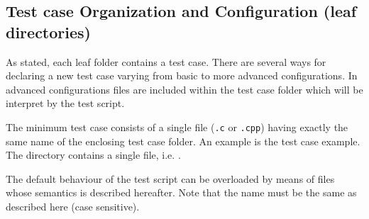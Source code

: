 \subsection{Test case Organization and Configuration (leaf directories)}
As stated, each leaf folder contains a test case. There are several ways for
declaring a new test case varying from basic to more advanced configurations. In
advanced configurations files are included within the test case folder which
will be interpret by the test script. 

The minimum test case consists of a single file ({\tt .c} or {\tt .cpp}) having
exactly the same name of the enclosing test case folder. An example is the
 test case example. The directory contains a single
file, i.e. .

The default behaviour of the test script can be overloaded by means of files
whose semantics is described hereafter. Note that the name must be the same as
described here (case sensitive).

